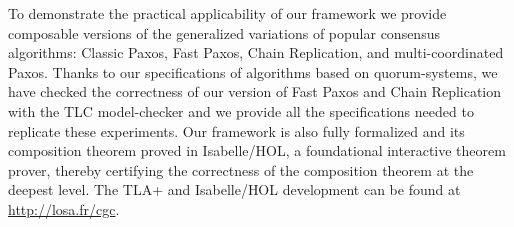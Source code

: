 \begin{comment}
Allowing the execution of commuting commands to proceed without
synchronization is an important practical optimization, as commands may
often commute in practice, for example when operating on disjoint parts
of a data structure. To enable the synchronization-free execution of
commuting commands, we have based our framework on Generalized Consensus
\cite{Lamport05GeneralizeConsensus}. Traditional SMR implementations use a
separate instance of a consensus algorithm to agree on the command to execute
at each index of the command sequence on which the replicas must agree. Using
separate consensus instances makes it hard to optimize the execution of
commuting command because commutativity is not a property of a single command.
Instead of restricting agreement to a single value, the Generalized Consensus
problem requires that set of replica servers agree on the state of a growing
data structure called a command-structure set. A command-structure set is
a data structure with an append operation such that the order in which two
commuting commands are appended does not change the resulting state. Thanks to
this property, two replicas executing commuting commands in a different order
will not end up in a different state and can continue executing without further
synchronization. In message-passing systems, this property can be leveraged to
reduce the latency of processing one command to two message delays instead of
three. 

In practice, a SMR algorithm must support fast reconfiguration to replace
faulty components, without which the long-term stability of a system is
inevitably compromised. Our framework abstracts over how the reconfiguration
decisions are made, providing an interface allowing to plug in an external
reconfiguration master implementing the reconfiguration policy of the
system. The master decides which GC module to run next and which replica
servers will participate, removing failed replicas and adding new ones. The
reconfiguration master enables tolerating $k$ failures with $k+1$ replicas
\cite{LamportMalkhiZhou09VerticalPaxosPrimarybackupReplication}, an important
improvement over the traditional $2k+1$ needed replicas.
\end{comment}

To demonstrate the practical applicability of our framework we provide
composable versions of the generalized variations of popular consensus
algorithms: Classic Paxos, Fast Paxos, Chain Replication, and multi-coordinated
Paxos. Thanks to our specifications of algorithms based on quorum-systems, 
we have checked the correctness of our version of Fast Paxos and Chain Replication with the TLC
model-checker and we provide all the specifications needed to replicate these
experiments. Our framework is also fully formalized and its composition theorem
proved in Isabelle/HOL, a foundational interactive theorem prover, thereby
certifying the correctness of the composition theorem at the deepest level.
The TLA+ and Isabelle/HOL development can be found at \url{http://losa.fr/cgc}.

